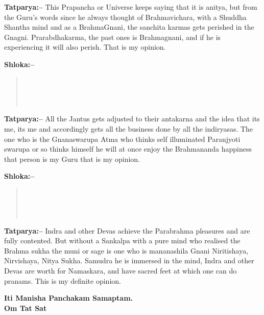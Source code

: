 \textbf{Tatparya:–} This Prapancha or Universe keeps saying that it is anitya, but from the Guru's words since he always thought of Brahmavichara, with a Shuddha Shantha mind and as a BrahmaGnani, the sanchita karmas gets perished in the Gnagni. Prarabdhakarma, the past ones is Brahmagnani, and if he is experiencing it will also perish. That is my opinion.

\textbf{Shloka:–}

\begin{verse}
 \\\\\\ 
\end{verse}

\textbf{Tatparya:–} All the Jantus gets adjusted to their antakarna and the idea that its me, its me and accordingly gets all the business done by all the indiryasas. The one who is the Gnanaswarupa Atma who thinks self illuminated Paranjyoti swarupa or so thinks himself he will at once enjoy the Brahmananda happiness that person is my Guru that is my opinion.

\textbf{Shloka:–}

\begin{verse}
 \\\\\\ 
\end{verse}

\textbf{Tatparya:–} Indra and other Devas achieve the Parabrahma pleasures and are fully contented. But without a Sankalpa with a pure mind who realised the Brahma sukha the muni or sage is one who is mananashila Gnani Niritishaya, Nirvishaya, Nitya Sukha. Samudra he is immersed in the mind, Indra and other Devas are worth for Namaskara, and have sacred feet at which one can do pranams. This is my definite opinion.

\begin{center}
\textbf{Iti Manisha Panchakam Samaptam.\\ Om Tat Sat}
\end{center}

